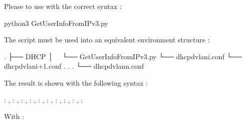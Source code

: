 \documentclass[letterpaper,10pt,english]{sphinxmanual}
\begin{document}
\sphinxAtStartPar
Please to use with the correct syntax :

\begin{sphinxVerbatim}[commandchars=\\\{\}]
python3 Get\PYGZus{}User\PYGZus{}Info\PYGZus{}From\PYGZus{}IP\PYGZus{}v3.py
\end{sphinxVerbatim}

\sphinxAtStartPar
The script must be used into an equivalent environment structure :

\begin{sphinxVerbatim}[commandchars=\\\{\}]
.
├── DHCP
│   └── Get\PYGZus{}User\PYGZus{}Info\PYGZus{}From\PYGZus{}IP\PYGZus{}v3.py
└── dhcpd\PYGZhy{}vlan\PYGZus{}i.conf
└── dhcpd\PYGZhy{}vlan\PYGZus{}i+1.conf
.
.
.
└── dhcpd\PYGZhy{}vlan\PYGZus{}n.conf
\end{sphinxVerbatim}

\sphinxAtStartPar
The result is shown with the following syntax :

\begin{sphinxVerbatim}[commandchars=\\\{\}]
: , : , : , : , : , : , : , : , : , : 
\end{sphinxVerbatim}

\sphinxAtStartPar
With :
\end{document}
